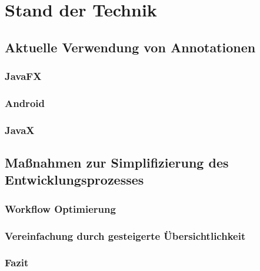 \chapter{Stand der Technik}
\label{stand_der_technik}


\section{Aktuelle Verwendung von Annotationen}
\label{aktuelle_verwendung_von_annotationen}


\subsection{JavaFX}
\label{aktuelle_verwendung_von_annotationen_javafx}


\subsection{Android}
\label{aktuelle_verwendung_von_annotationen_android}


\subsection{JavaX}
\label{aktuelle_verwendung_von_annotationen_javax}


\section{Maßnahmen zur Simplifizierung des Entwicklungsprozesses}
\label{maßnahmen_zur_simplifizierung_des_entwicklungsprozesses}


\subsection{Workflow Optimierung}
\label{maßnahmen_zur_simplifizierung_des_entwicklungsprozesses_workflow}


\subsection{Vereinfachung durch gesteigerte Übersichtlichkeit}
\label{maßnahmen_zur_simplifizierung_des_entwicklungsprozesses_übersichtichkeit}


\subsection{Fazit}
\label{maßnahmen_zur_simplifizierung_des_entwicklungsprozesses_fazit}

